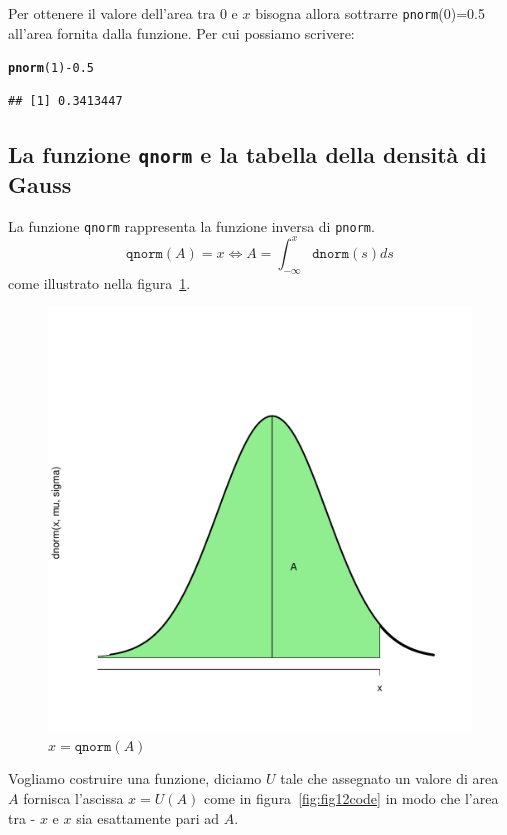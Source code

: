 \documentclass[onecolumn,12pt]{book}\usepackage[]{graphicx}\usepackage[]{color}
\makeatletter
\def\maxwidth{ %
  \ifdim\Gin@nat@width>\linewidth
    \linewidth
  \else
    \Gin@nat@width
  \fi
}
\newcommand{\hlnum}[1]{\textcolor[rgb]{0.686,0.059,0.569}{#1}}%
\newcommand{\hlopt}[1]{\textcolor[rgb]{0,0,0}{#1}}%
\newcommand{\hlstd}[1]{\textcolor[rgb]{0.345,0.345,0.345}{#1}}%
\newcommand{\hlkwd}[1]{\textcolor[rgb]{0.737,0.353,0.396}{\textbf{#1}}}%
\newenvironment{kframe}{%
 \def\at@end@of@kframe{}%
 \ifinner\ifhmode%
  \def\at@end@of@kframe{\end{minipage}}%
  \begin{minipage}{\columnwidth}%
 \fi\fi%
 \def\FrameCommand##1{\hskip\@totalleftmargin \hskip-\fboxsep
 \colorbox{shadecolor}{##1}\hskip-\fboxsep
     \hskip-\linewidth \hskip-\@totalleftmargin \hskip\columnwidth}%
 \MakeFramed {\advance\hsize-\width
   \@totalleftmargin\z@ \linewidth\hsize
   \@setminipage}}%
 {\par\unskip\endMakeFramed%
 \at@end@of@kframe}
\newenvironment{knitrout}{}{} %
\makeatother
\begin{document}
Per ottenere il valore dell'area tra 0 e $x$ bisogna allora sottrarre \texttt{pnorm}(0)=0.5 all'area fornita dalla funzione.
Per cui possiamo scrivere:
\begin{knitrout}
\color{fgcolor}\begin{kframe}
\begin{alltt}
\hlkwd{pnorm}\hlstd{(}\hlnum{1}\hlstd{)}\hlopt{-}\hlnum{0.5}
\end{alltt}
\begin{verbatim}
## [1] 0.3413447
\end{verbatim}
\end{kframe}
\end{knitrout}


\subsection{La funzione \texttt{qnorm} e la tabella della densit\`a di Gauss}


La funzione \texttt{qnorm} rappresenta la funzione inversa di \texttt{pnorm}.
\[\texttt{qnorm}(A)=x\Leftrightarrow A=\int_{-\infty}^x \texttt{dnorm}(s)ds\] 
come illustrato nella figura~\ref{fig:fig2code}.
\begin{center}
\begin{figure}[H]
\begin{knitrout}
\color{fgcolor}
\includegraphics[width=\maxwidth]{figure/unnamed-chunk-143-1} 

\end{knitrout}
\caption{$x=\texttt{qnorm}(A)$}
\label{fig:fig2code}
\end{figure}
\end{center}
Vogliamo costruire una funzione, diciamo $U$ tale che assegnato un valore di area $A$   fornisca l'ascissa $x=U(A)$ come in figura~\ref{fig:fig12code} in modo che l'area tra - $x$ e $x$ sia esattamente pari ad $A$.  
\end{document}
